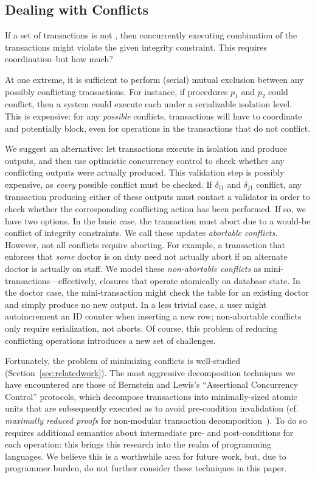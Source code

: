 \subsection{Dealing with Conflicts}
\label{sec:conflicts}

If a set of transactions is not \iconfluent, then concurrently
executing combination of the transactions might violate the given
integrity constraint. This requires coordination--but how much?

At one extreme, it is sufficient to perform (serial) mutual exclusion
between any possibly conflicting transactions. For instance, if
procedures $p_1$ and $p_2$ could conflict, then a system could execute
each under a serializable isolation level. This is expensive: for any
\textit{possible} conflicts, transactions will have to coordinate and
potentially block, even for operations in the transactions that do not
conflict.

We suggest an alternative: let transactions execute in isolation and
produce outputs, and then use optimistic concurrency control to check
whether any conflicting outputs were actually produced. This
validation step is possibly expensive, as \textit{every} possible
conflict must be checked. If $\delta_{i1}$ and $\delta_{j1}$ conflict,
any transaction producing either of these outputs must contact a
validator in order to check whether the corresponding conflicting
action has been performed. If so, we have two options. In the basic
case, the transaction must abort due to a would-be conflict of
integrity constraints. We call these updates \textit{abortable
  conflicts}. However, not all conflicts require aborting. For
example, a transaction that enforces that \textit{some} doctor is on
duty need not actually abort if an alternate doctor is actually on
staff. We model these \textit{non-abortable conflicts} as
mini-transactions---effectively, closures that operate atomically on
database state. In the doctor case, the mini-transaction might check
the table for an existing doctor and simply produce no new output. In
a less trivial case, a user might autoincrement an ID counter when
inserting a new row; non-abortable conflicts only require
serialization, not aborts. Of course, this problem of reducing
conflicting operations introduces a new set of challenges.

Fortunately, the problem of minimizing conflicts is well-studied
(Section~\ref{sec:relatedwork}). The most aggressive decomposition
techniques we have encountered are those of Bernstein and Lewis's
``Assertional Concurrency Control'' protocols, which decompose
transactions into minimally-sized atomic units that are subsequently
executed as to avoid pre-condition invalidation (cf. \textit{maximally
  reduced proofs} for non-modular transaction
decomposition~\cite{decomp-semantics}). To do so requires additional
semantics about intermediate pre- and post-conditions for each
operation: this brings this research into the realm of programming
languages. We believe this is a worthwhile area for future work, but,
due to programmer burden, do not further consider these techniques in
this paper.


